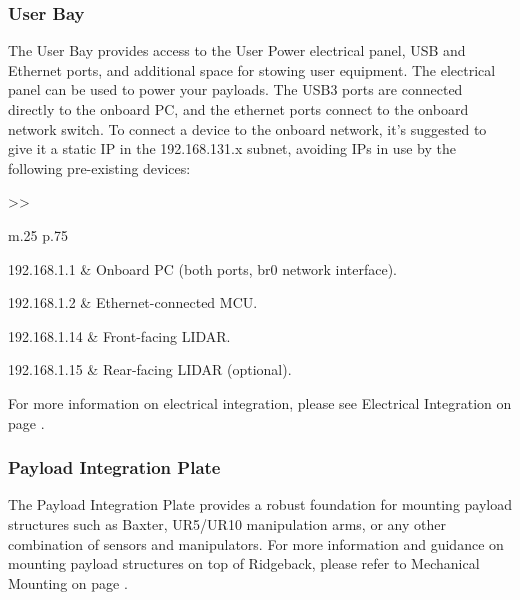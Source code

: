 \documentclass[]{clearpath-latex/clearpath-manual}
\begin{document}
\subsubsection{User Bay}

The User Bay provides access to the User Power electrical panel, USB and Ethernet ports, and additional space for stowing user equipment.  The electrical panel can be used to power your payloads. The USB3 ports are connected directly to the onboard PC, and the ethernet ports connect to the onboard network switch. To connect a device to the onboard network, it's suggested to give it a static IP in the 192.168.131.x subnet, avoiding IPs in use by the following pre-existing devices:

\bgroup
\def\arraystretch{1.2}%
\begin{table}[h]
	\centering
	\begin{tabular}{>{}>{\raggedright}m{.25\textwidth} p{.75\textwidth}} \hline

	192.168.1.1 & Onboard PC (both ports, br0 network interface). \\ \hline

	192.168.1.2 & Ethernet-connected MCU. \\ \hline

	192.168.1.14 & Front-facing LIDAR. \\ \hline

	192.168.1.15 & Rear-facing LIDAR (optional). \\ \hline

	\end{tabular}
\newline
\caption{Ridgeback Onboard Network Devices}
\label{netdevs}
\end{table}
\egroup

For more information on electrical integration, please see Electrical Integration on page \pageref{electrical}.


\subsubsection{Payload Integration Plate}

The Payload Integration Plate provides a robust foundation for mounting payload structures such as Baxter, UR5/UR10 manipulation arms, or any other combination of sensors and manipulators.   For more information and guidance on mounting payload structures on top of Ridgeback, please refer to Mechanical Mounting on page \pageref{mechanical}.
\end{document}

